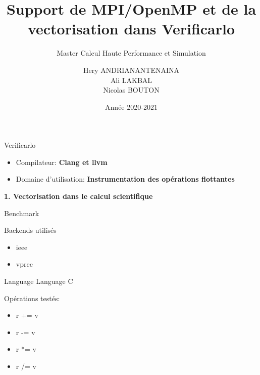 \documentclass{beamer}
\title[Support pour Verificarlo]{Support de MPI/OpenMP et de la vectorisation dans Verificarlo}
\subtitle{Master Calcul Haute Performance et Simulation}
\author[Hery, Ali, Nicolas]{Hery ANDRIANANTENAINA \\ Ali LAKBAL \\ Nicolas BOUTON}
\institute{\textbf{Encadrant:} Eric PETIT}
\date{Année 2020-2021}
\begin{document}
\maketitle

\begin{frame}{Verificarlo}

  \begin{itemize}
  \item Compilateur: \textbf{ Clang et llvm} 
  \item Domaine d'utilisation: \textbf{ Instrumentation des opérations flottantes}
  \end{itemize}
  
  \textbf{1. Vectorisation dans le calcul scientifique}
  
\end{frame}

\begin{frame}{Benchmark}

  \begin{block}{Backends utilisés}
    \begin{itemize}
    \item ieee
    \item vprec
    \end{itemize}
  \end{block}

  \begin{block}{Language}
    Language C
  \end{block}
  
  \begin{block}{Opérations testés:}
    \begin{itemize}
    \item r += v
    \item r -= v
    \item r *= v
    \item r /= v
    \end{itemize}
  \end{block}

\end{frame}
\end{document}
